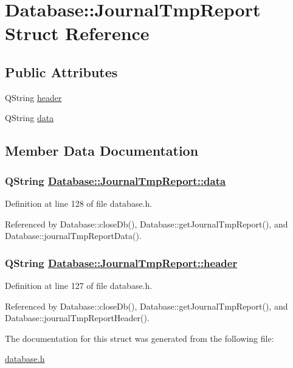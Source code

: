 \hypertarget{structDatabase_1_1JournalTmpReport}{
\section{Database::Journal\-Tmp\-Report Struct Reference}
\label{structDatabase_1_1JournalTmpReport}
}
\subsection*{Public Attributes}
\begin{CompactItemize}
\item 
QString \hyperlink{structDatabase_1_1JournalTmpReport_o0}{header}
\item 
QString \hyperlink{structDatabase_1_1JournalTmpReport_o1}{data}
\end{CompactItemize}


\subsection{Member Data Documentation}
\hypertarget{structDatabase_1_1JournalTmpReport_o1}{
\subsubsection[data]{\setlength{\rightskip}{0pt plus 5cm}QString \hyperlink{structDatabase_1_1JournalTmpReport_o1}{Database::Journal\-Tmp\-Report::data}}}
\label{structDatabase_1_1JournalTmpReport_o1}


Definition at line 128 of file database.h.

Referenced by Database::close\-Db(), Database::get\-Journal\-Tmp\-Report(), and Database::journal\-Tmp\-Report\-Data().\hypertarget{structDatabase_1_1JournalTmpReport_o0}{
\subsubsection[header]{\setlength{\rightskip}{0pt plus 5cm}QString \hyperlink{structDatabase_1_1JournalTmpReport_o0}{Database::Journal\-Tmp\-Report::header}}}
\label{structDatabase_1_1JournalTmpReport_o0}


Definition at line 127 of file database.h.

Referenced by Database::close\-Db(), Database::get\-Journal\-Tmp\-Report(), and Database::journal\-Tmp\-Report\-Header().

The documentation for this struct was generated from the following file:\begin{CompactItemize}
\item 
\hyperlink{database_8h}{database.h}\end{CompactItemize}
